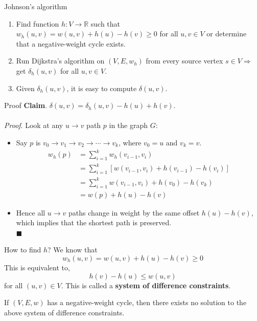 \documentclass{beamer}
\renewcommand{\qed}{\\ \hfill $\blacksquare$}
\begin{document}
\begin{frame}{Johnson’s algorithm}
    \begin{enumerate}
        \item Find function $h: V \rightarrow \mathbb{R}$ such that $w_h (u, v) = w(u, v) + h(u) - h(v) \geq 0$ for all $u, v \in V$ or determine that a negative-weight cycle exists.
        \item Run Dijkstra’s algorithm on $(V, E, w_h)$ from every source vertex $s \in V \Rightarrow$ get $\delta_h (u, v)$ for all $u, v \in V$.
        \item Given $\delta_h (u, v)$, it is easy to compute $\delta(u, v)$.
    \end{enumerate}
\end{frame}

\begin{frame}{Proof}
    \textbf{Claim}. $\delta(u, v) = \delta_h (u, v) - h(u) + h(v)$. \\
    \\
    \textit{Proof}. Look at any $u \rightarrow v$ path $p$ in the graph $G$:
    \begin{itemize}
        \footnotesize
        \item Say $p$ is $v_0 \rightarrow v_1 \rightarrow v_2 \rightarrow \cdots \rightarrow v_k$, where $v_0 = u$ and $v_k = v$.
        \begin{equation*}
            \begin{align*}
                w_h (p) &= \sum_{i = 1}^{k} w_h (v_{i - 1}, v_i) \\
                        &= \sum_{i = 1}^{k} [w(v_{i - 1}, v_i) + h(v_{i-1}) - h(v_i)] \\
                        &= \sum_{i = 1}^{k} w(v_{i - 1}, v_i) + h(v_0) - h(v_k) \\
                        &= w(p) + h(u) - h(v)
            \end{align*}
        \end{equation*}
        \item Hence all $u \rightarrow v$ paths change in weight by the same oﬀset $h(u) - h(v)$, which implies that the shortest path is preserved. \qed
    \end{itemize}
\end{frame}

\begin{frame}{How to ﬁnd $h$?}
    We know that
        $$w_h (u, v) = w(u, v) + h(u) - h(v) \geq 0$$
    This is equivalent to,
        $$h(v) - h(u) \leq w(u, v)$$
    for all $(u, v) \in V$. This is called a \textbf{system of difference constraints}.
    \begin{tcolorbox}[title=Theorem.]
        If $(V, E, w)$ has a negative-weight cycle, then there exists no solution to the above system of difference constraints.
    \end{tcolorbox}
\end{frame}
\end{document}
